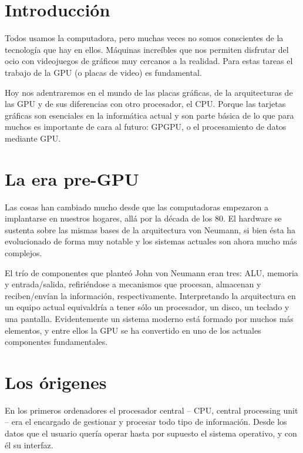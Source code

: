 \documentclass[a4paper,openright,12pt, oneside]{book}
\begin{document}
\section{Introducci\'on}

Todos usamos la computadora, pero muchas veces no somos conscientes de la tecnolog\'ia que hay en ellos. 
M\'aquinas incre\'ibles que nos permiten disfrutar del ocio con videojuegos de gr\'aficos muy cercanos a la realidad. 
Para estas tareas el trabajo de la GPU (o placas de video) es fundamental.

Hoy nos adentraremos en el mundo de las placas gr\'aficas, de la arquitecturas de las GPU y de sus diferencias con otro procesador, el CPU. 
Porque las tarjetas gr\'aficas son esenciales en la inform\'atica actual y son parte b\'asica de lo que para muchos es importante de cara al futuro: 
GPGPU, o el procesamiento de datos mediante GPU.

\section{La era pre-GPU}

Las cosas han cambiado mucho desde que las computadoras empezaron a implantarse en nuestros hogares, all\'a por la d\'ecada de los 80. El hardware se sustenta sobre las mismas bases de la arquitectura von Neumann, si bien \'esta ha evolucionado de forma muy notable y los sistemas actuales son ahora mucho m\'as complejos.

El tr\'io de componentes que plante\'o John von Neumann eran tres: ALU, memoria y entrada/salida, refiri\'endose a mecanismos que procesan, almacenan y reciben/env\'ian la informaci\'on, respectivamente. Interpretando la arquitectura en un equipo actual equivaldr\'ia a tener s\'olo un procesador, un disco, un teclado y una pantalla. 
Evidentemente un sistema moderno est\'a formado por muchos m\'as elementos, y entre ellos la GPU se ha convertido en uno de los actuales componentes fundamentales.

\section{Los \'origenes}

En los primeros ordenadores el procesador central -- CPU, central processing unit -- era el encargado de gestionar y procesar todo tipo de informaci\'on. Desde los datos que el usuario quer\'ia operar hasta por supuesto el sistema operativo, y con \'el su interfaz.
\end{document}

